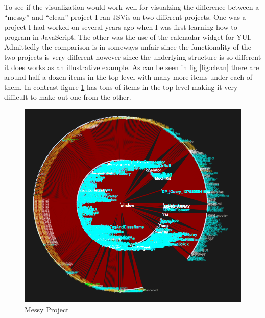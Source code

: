 \documentclass[]{article}
\begin{document}
To see if the visualization would work well for visualzing the difference between a ``messy'' and ``clean'' project I ran JSVis on two different projects. One was a project I had worked on several years ago when I was first learning how to program in JavaScript. The other was the use of the calenadar widget for YUI. Admittedly the comparison is in someways unfair since the functionality of the two projects is very different however since the underlying structure is so different it does works as an illustrative example. As can be seen in fig \ref{fig:clean} there are around half a dozen items in the top level with many more items under each of them. In contrast figure \ref{fig:messy} has tons of items in the top level making it very difficult to make out one from the other.


\begin{figure}[h]
  \begin{center}
    \includegraphics[scale=.25]{messy.png}
  \end{center}
  \caption{Messy Project}
  \label{fig:messy}
\end{figure}
\end{document}
